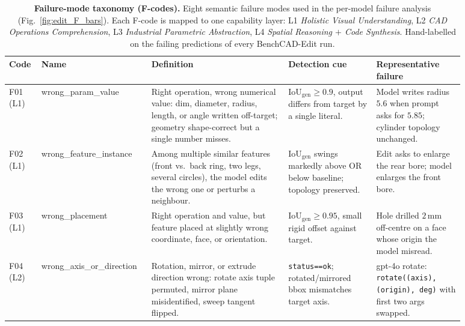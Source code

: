 \begin{table}[t]
\centering
\caption{\textbf{Failure-mode taxonomy (F-codes).} Eight semantic failure modes used in the per-model failure analysis (Fig.~\ref{fig:edit_F_bars}). Each F-code is mapped to one capability layer: L1 \emph{Holistic Visual Understanding}, L2 \emph{CAD Operations Comprehension}, L3 \emph{Industrial Parametric Abstraction}, L4 \emph{Spatial Reasoning $+$ Code Synthesis}. Hand-labelled on the failing predictions of every BenchCAD-Edit run.}
\label{tab:failure_codes}
\small
\setlength{\tabcolsep}{4pt}
\renewcommand{\arraystretch}{1.15}
\newcommand{\fname}[1]{\seqsplitfallback{#1}}
\providecommand{\seqsplitfallback}[1]{#1}
\begin{tabular}{@{}p{0.06\linewidth}p{0.18\linewidth}p{0.28\linewidth}p{0.18\linewidth}p{0.18\linewidth}@{}}
\toprule
\textbf{Code} & \textbf{Name} & \textbf{Definition} & \textbf{Detection cue} & \textbf{Representative failure} \\
\midrule
F01 \mbox{(L1)} & wrong\_\allowbreak param\_\allowbreak value & Right operation, wrong numerical value: dim, diameter, radius, length, or angle written off-target; geometry shape-correct but a single number misses. & $\mathrm{IoU}_{\text{gen}} \geq 0.9$, output differs from target by a single literal. & Model writes radius $5.6$ when prompt asks for $5.85$; cylinder topology unchanged. \\
F02 \mbox{(L1)} & wrong\_\allowbreak feature\_\allowbreak instance & Among multiple similar features (front vs.\ back ring, two legs, several circles), the model edits the wrong one or perturbs a neighbour. & $\mathrm{IoU}_{\text{gen}}$ swings markedly above OR below baseline; topology preserved. & Edit asks to enlarge the rear bore; model enlarges the front bore. \\
F03 \mbox{(L1)} & wrong\_\allowbreak placement & Right operation and value, but feature placed at slightly wrong coordinate, face, or orientation. & $\mathrm{IoU}_{\text{gen}} \geq 0.95$, small rigid offset against target. & Hole drilled $2$\,mm off-centre on a face whose origin the model misread. \\
F04 \mbox{(L2)} & wrong\_\allowbreak axis\_\allowbreak or\_\allowbreak direction & Rotation, mirror, or extrude direction wrong: rotate axis tuple permuted, mirror plane misidentified, sweep tangent flipped. & \texttt{status==ok}; rotated/mirrored bbox mismatches target axis. & gpt-4o rotate: \texttt{rotate((axis), (origin), deg)} with first two args swapped. \\

\end{tabular}
\end{table}
